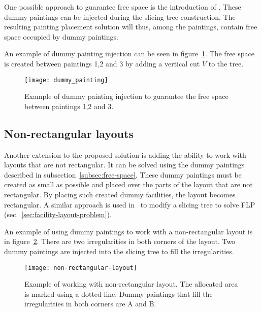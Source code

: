 One possible approach to guarantee free space is the introduction of .
These dummy paintings can be injected during the slicing tree construction.
The resulting painting placement solution will thus, among the paintings, contain free space occupied by dummy paintings.

An example of dummy painting injection can be seen in figure~\ref{fig:dummy-painting}.
The free space is created between paintings 1,2 and 3 by adding a vertical cut $V$ to the tree.


\begin{figure}[h!]
    \texttt{[image: dummy\_painting]}
    \caption[Example of dummy painting injection]{Example of dummy painting injection to guarantee the free space between paintings 1,2 and 3.}
    \label{fig:dummy-painting}
\end{figure}

\subsection{Non-rectangular layouts}\label{subsec:non-rectangular-layouts}

Another extension to the proposed solution is adding the ability to work with layouts that are not rectangular.
It can be solved using the dummy paintings described in subsection~\ref{subsec:free-space}.
These dummy paintings must be created as small as possible and placed over the parts of the layout that are not rectangular.
By placing such created dummy facilities, the layout becomes rectangular.
A similar approach is used in~\cite{scholzExtensionsSTaTSPractical2010} to modify a slicing tree to solve FLP (sec.~\ref{sec:facility-layout-problem}).

An example of using dummy paintings to work with a non-rectangular layout is in figure~\ref{fig:non-rectangular-layout}.
There are two irregularities in both corners of the layout.
Two dummy paintings are injected into the slicing tree to fill the irregularities.

\begin{figure}[h!]
    \texttt{[image: non-rectangular-layout]}
    \caption[Example of working with non-rectangular layout]{Example of working with non-rectangular layout. The allocated area is marked using a dotted line.
    Dummy paintings that fill the irregularities in both corners are A and B.}
    \label{fig:non-rectangular-layout}
\end{figure}

